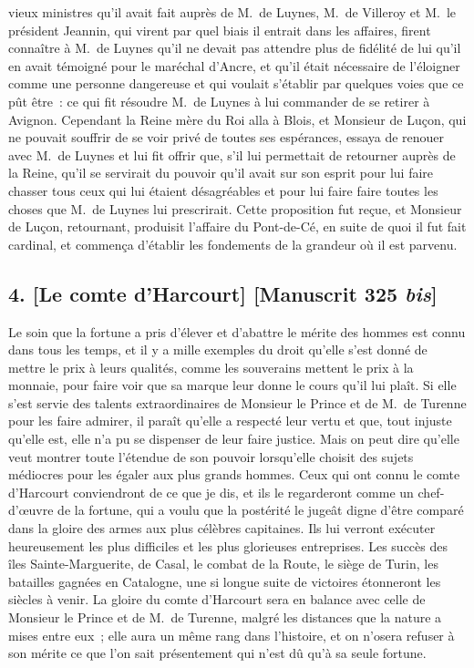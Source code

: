 \documentclass[french,twoside]{book} %
\begin{document}
vieux ministres qu’il avait fait auprès de M. de Luynes, M. de Villeroy et M. le président Jeannin, qui virent par quel biais il entrait dans les affaires, firent connaître à M. de Luynes qu’il ne devait pas attendre plus de fidélité de lui qu’il en avait témoigné pour le maréchal d’Ancre, et qu’il était nécessaire de l’éloigner comme une personne dangereuse et qui voulait s’établir par quelques voies que ce pût être : ce qui fit résoudre M. de Luynes à lui commander de se retirer à Avignon. Cependant la Reine mère du Roi alla à Blois, et Monsieur de Luçon, qui ne pouvait souffrir de se voir privé de toutes ses espérances, essaya de renouer avec M. de Luynes et lui fit offrir que, s’il lui permettait de retourner auprès de la Reine, qu’il se servirait du pouvoir qu’il avait sur son esprit pour lui faire chasser tous ceux qui lui étaient désagréables et pour lui faire faire toutes les choses que M. de Luynes lui prescrirait. Cette proposition fut reçue, et Monsieur de Luçon, retournant, produisit l’affaire du Pont-de-Cé, en suite de quoi il fut fait cardinal, et commença d’établir les fondements de la grandeur où il est parvenu.
\subsection[{4. [Le comte d’Harcourt] [Manuscrit 325 bis]}]{4. [Le comte d’Harcourt] [Manuscrit 325 {\itshape bis}]}
\noindent Le soin que la fortune a pris d’élever et d’abattre le mérite des hommes est connu dans tous les temps, et il y a mille exemples du droit qu’elle s’est donné de mettre le prix à leurs qualités, comme les souverains mettent le prix à la monnaie, pour faire voir que sa marque leur donne le cours qu’il lui plaît. Si elle s’est servie des talents extraordinaires de Monsieur le Prince et de M. de Turenne pour les faire admirer, il paraît qu’elle a respecté leur vertu et que, tout injuste qu’elle est, elle n’a pu se dispenser de leur faire justice. Mais on peut dire qu’elle veut montrer toute l’étendue de son pouvoir lorsqu’elle choisit des sujets médiocres pour les égaler aux plus grands hommes. Ceux qui ont connu le comte d’Harcourt conviendront de ce que je dis, et ils le regarderont comme un chef-d’œuvre de la fortune, qui a voulu que la postérité le jugeât digne d’être comparé dans la gloire des armes aux plus célèbres capitaines. Ils lui verront exécuter heureusement les plus difficiles et les plus glorieuses entreprises. Les succès des îles Sainte-Marguerite, de Casal, le combat de la Route, le siège de Turin, les batailles gagnées en Catalogne, une si longue suite de victoires étonneront les siècles à venir. La gloire du comte d’Harcourt sera en balance avec celle de Monsieur le Prince et de M. de Turenne, malgré les distances que la nature a mises entre eux ; elle aura un même rang dans l’histoire, et on n’osera refuser à son mérite ce que l’on sait présentement qui n’est dû qu’à sa seule fortune.
\end{document}
